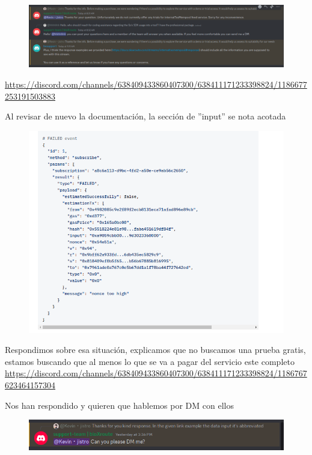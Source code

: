 \begin{figure}
    \centering
    \includegraphics[width=1\linewidth]{img//screenshots/imagebXrrespuesta1901.png}
\end{figure}
\url{https://discord.com/channels/638409433860407300/638411171233398824/1186677253191503883}

Al revisar de nuevo la documentación, la sección de ''input'' se nota acotada 
\begin{figure}
    \centering
    \includegraphics[width=1\linewidth]{img//screenshots/imageblox.png}
\end{figure}
Respondimos sobre esa situación, explicamos que no buscamos una prueba gratis, estamos buscando que al menos lo que se va a pagar del servicio este completo
\url{https://discord.com/channels/638409433860407300/638411171233398824/1186767623464157304}

Nos han respondido y quieren que hablemos por DM con ellos
\begin{figure}
    \centering
    \includegraphics[width=1\linewidth]{img//screenshots/imd1122322age.png}
\end{figure}

